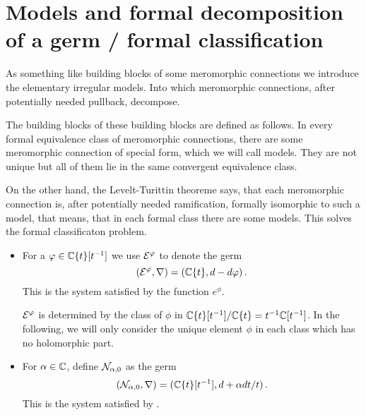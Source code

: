 \section{Models and formal decomposition of a germ / formal classification}
\begin{paracol}{2}
\switchcolumn[0]\noindent
  As something like building blocks of some meromorphic connections we introduce
  the elementary irregular models. Into which meromorphic connections, after
  potentially needed pullback, decompose.

  The building blocks of these building blocks are defined as follows.
\switchcolumn[1]\noindent
  In every formal equivalence class of meromorphic connections, there are some
  meromorphic connection of special form, which we will call models. They are
  not unique but all of them lie in the same convergent equivalence class.

  On the other hand, the Levelt-Turittin theoreme says,
  that  each meromorphic connection is, after potentially needed ramification,
  formally isomorphic to such a model, that means, that in each formal class
  there are some models.
  This solves the formal classificaton problem.
\end{paracol}
\begin{defn}
  \begin{itemize}
    \item For a $\varphi\in\mathbb{C}\{t\}[t^{-1}]$ we use $\mathcal{E}^{\varphi}$ to denote the germ
      \[
        (\mathcal{E}^{\varphi},\nabla)=(\mathbb{C}\{t\},d-d\varphi)\,.
      \]
      This is the system satisfied by the function $e^\phi$.
      \begin{cor}
        $\mathcal{E}^\varphi$ is determined by the class of $\phi$ in
        $\mathbb{C}\{t\}[t^{-1}]/\mathbb{C}\{t\}=t^{-1}\mathbb{C}[t^{-1}]$. In the following, we will
        only consider the unique element $\phi$ in each class which has no
        holomorphic part.
      \end{cor}
    \item For $\alpha\in\mathbb{C}$, define $\mathcal{N}_{\alpha,0}$ as the germ
      \[
        (\mathcal{N}_{\alpha,0},\nabla)=(\mathbb{C}\{t\}[t^{-1}],d+\alpha dt/t)\,.
      \]
      This is the system satisfied by \TODO{}.
  \end{itemize}
\end{defn}
